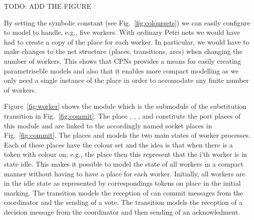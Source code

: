 TODO: ADD THE FIGURE


By setting the symbolic constant  (see
Fig.~\ref{fig:coloursets}) we can easily configure to model to handle,
e.g., five workers. With ordinary Petri nets we would have had to
create a copy of the  place for each worker. In
particular, we would have to make changes to the net structure
(places, transitions, arcs) when changing the number of workers. This
shows that CPNs provides a means for easily creating parametriseble
models and also that it enables more compact modelling as we only need
a single instance of the  place in order to
accomodate any finite number of workers.



Figure~\ref{fig:worker} shows the  module which is the
submodule of the  substitution transition in
Fig.~\ref{fig:commit}. The place , ,
, and  constitute the port
places of this module and are linked to the accordingly named socket
places in Fig.~\ref{fig:commit}. The places  and
 models the two main states of worker processes. Each
of these places have the colour set  and the idea is
that when there is a token with colour  on, e.g., the
place  then this represent that the i'th worker is in
state idle. This makes it possible to model the state of all workers
in a compact manner without having to have a place for each
worker. Initially, all workers are in the idle state as represented by
correspondings tokens on place  in the initial
marking. The transition  models the
reception of can commit messages from the coordinator and the sending
of a vote. The transition  models the
reception of a decision message from the coordinator and then sending
of an acknowledment. 


